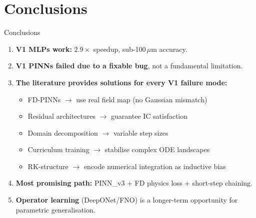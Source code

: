 \documentclass[aspectratio=169, 11pt]{beamer}
\begin{document}
\section{Conclusions}

\begin{frame}{Conclusions}
  \begin{enumerate}
    \item \textbf{V1 MLPs work:} $2.9\times$ speedup, sub-100\,$\mu$m accuracy.

    \medskip
    \item \textbf{V1 PINNs failed due to a fixable bug}, not a fundamental limitation.

    \medskip
    \item \textbf{The literature provides solutions for every V1 failure mode:}
      \begin{itemize}
        \item FD-PINNs $\to$ use real field map (no Gaussian mismatch)
        \item Residual architectures $\to$ guarantee IC satisfaction
        \item Domain decomposition $\to$ variable step sizes
        \item Curriculum training $\to$ stabilise complex ODE landscapes
        \item RK-structure $\to$ encode numerical integration as inductive bias
      \end{itemize}

    \medskip
    \item \textbf{Most promising path:} PINN\_v3 + FD physics loss + short-step chaining.

    \medskip
    \item \textbf{Operator learning} (DeepONet/FNO) is a longer-term opportunity for parametric generalisation.
  \end{enumerate}
\end{frame}

\end{document}
